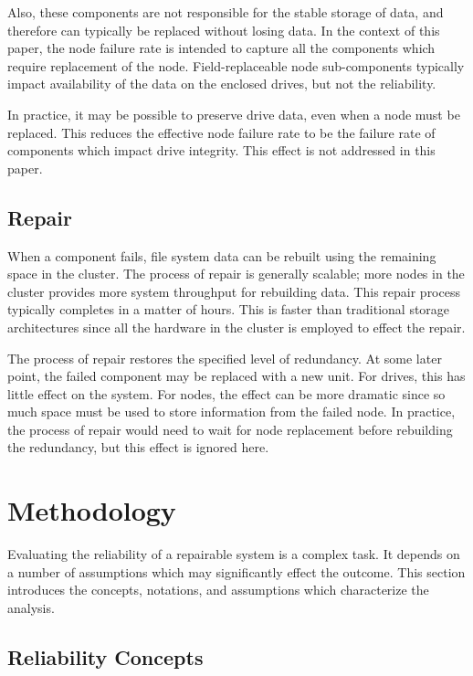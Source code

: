 \documentclass[11pt]{article}
\numberwithin{equation}{section}
\begin{document}
Also, these components are not responsible for the stable storage of data, and
therefore can typically be replaced without losing data.  In the context of
this paper, the node failure rate is intended to capture all the components
which require replacement of the node.  Field-replaceable node sub-components
typically impact availability of the data on the enclosed drives, but not the
reliability.

In practice, it may be possible to preserve drive data, even when a node must
be replaced.  This reduces the effective node failure rate to be the failure
rate of components which impact drive integrity.  This effect is not addressed
in this paper.

\subsection{Repair}
\label{sec-repair}

When a component fails, file system data can be rebuilt using the remaining
space in the cluster.  The process of repair is generally scalable; more nodes
in the cluster provides more system throughput for rebuilding data.  This
repair process typically completes in a matter of hours.  This is faster than
traditional storage architectures since all the hardware in the cluster is
employed to effect the repair.

The process of repair restores the specified level of redundancy.  At some
later point, the failed component may be replaced with a new unit.  For
drives, this has little effect on the system.  For nodes, the effect can be
more dramatic since so much space must be used to store information from the
failed node.  In practice, the process of repair would need to wait for node
replacement before rebuilding the redundancy, but this effect is ignored here.

\section{Methodology}
\label{sec-methodology}

Evaluating the reliability of a repairable system is a complex task.  It
depends on a number of assumptions which may significantly effect the outcome.
This section introduces the concepts, notations, and assumptions which
characterize the analysis.

\subsection{Reliability Concepts}
\end{document}
